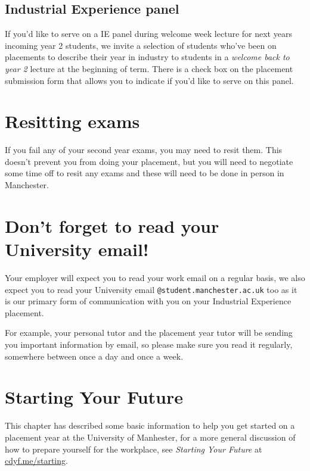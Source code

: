 \documentclass[
]{book}
\begin{document}
\subsection{Industrial Experience panel}\label{six}

If you'd like to serve on a IE panel during welcome week lecture for next years incoming year 2 students, we invite a selection of students who've been on placements to describe their year in industry to students in a \emph{welcome back to year 2} lecture at the beginning of term. There is a check box on the placement submission form that allows you to indicate if you'd like to serve on this panel.

\section{Resitting exams}\label{resits}

If you fail any of your second year exams, you may need to resit them. This doesn't prevent you from doing your placement, but you will need to negotiate some time off to resit any exams and these will need to be done in person in Manchester. \citep{resits}

\section{Don't forget to read your University email!}\label{email}

Your employer will expect you to read your work email on a regular basis, we also expect you to read your University email \texttt{@student.manchester.ac.uk} too as it is our primary form of communication with you on your Industrial Experience placement.

For example, your personal tutor and the placement year tutor will be sending you important information by email, so please make sure you read it regularly, somewhere between once a day and once a week.

\section{Starting Your Future}\label{etc}

This chapter has described some basic information to help you get started on a placement year at the University of Manhester, for a more general discussion of how to prepare yourself for the workplace, see \emph{Starting Your Future} at \href{https://www.cdyf.me/starting}{cdyf.me/starting}. \citep{starting}
\end{document}
